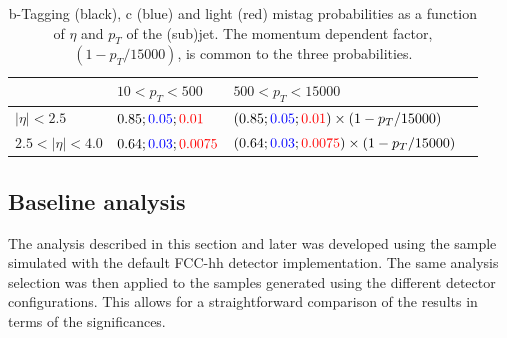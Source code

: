 \begin{table}
	\centering
	\caption{b-Tagging (black), c (blue) and light (red) mistag probabilities as a function of $\eta$ and $p_T$ of the (sub)jet. The momentum dependent factor, $\left(1-p_T/15000\right)$, is common to the three probabilities.}
	\begin{tabular}{llll}
		\toprule 
		\backslashbox{$\eta$}{$p_T$} & $10<p_T<500$ & $500<p_T<15000$ &  \\
		\midrule
		$|\eta|<2.5$ & $0.85;\textcolor{blue}{0.05};\textcolor{red}{0.01} $ & $(0.85;\textcolor{blue}{0.05};\textcolor{red}{0.01})\times\left(1-p_T/15000\right)$ &   \\
		\rowcolor{black!7} $2.5<|\eta|<4.0$ & $0.64;\textcolor{blue}{0.03};\textcolor{red}{0.0075}$ & $(0.64;\textcolor{blue}{0.03};\textcolor{red}{0.0075})\times\left(1-p_T/15000\right)$ &  \\
		\bottomrule
	\end{tabular}
	\label{table:btag}
\end{table}

%
%
%

\subsection{Baseline analysis}

The analysis described in this section and later was developed using the sample simulated with the default FCC-hh detector implementation. The same analysis selection was then applied to the samples generated using the different detector configurations. This allows for a straightforward comparison of the results in terms of the significances.

